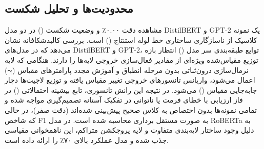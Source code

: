 \subsection{محدودیت‌ها و تحلیل شکست}
مشاهده دقت ۰.۰۰٪ و وضعیت شکست () در دو مدل DistilBERT و GPT-2 یک نمونه کلاسیک از ناسازگاری ساختاری خط لوله استنتاج () است. بررسی کالبدشکافانه نشان می‌دهد که در مدل‌های DistilBERT و GPT-2، توابع طبقه‌بندی سر مدل () انتظار بازه توزیع مقیاس‌شده ویژه‌ای از مقادیر فعال‌سازی خروجی لایه‌ها را دارند. هنگامی که لایه نرمال‌سازی درون‌ثباتی  بدون مرحله انطباق و آموزش مجدد پارامترهای مقیاس ($\boldsymbol{\gamma}$) اعمال می‌شود، واریانس تانسورهای خروجی تغییر مقیاس یافته و توزیع لاجیت‌ها دچار جابه‌جایی مقیاس () می‌شود. در نتیجه این رانش تانسوری، تابع بیشینه احتمالاتی () در فاز ارزیابی با خطای فرمت یا ناتوانی در تفکیک آستانه تصمیم‌گیری مواجه شده و تمامی نمونه‌ها بدون اختصاص به کلاس صحیح پیش‌بینی شده‌اند (دقت صفر)، در حالی که شاخص F1 به صورت مستقل برداری محاسبه شده است. در مدل RoBERTa به دلیل وجود ساختار لایه‌بندی متفاوت و لایه پروجکشن متراکم، این ناهمخوانی مقیاسی جذب شده و مدل عملکرد بالای ۷۰٪ را ارائه داده است.
